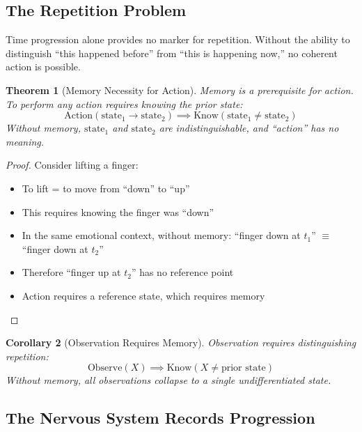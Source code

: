 \documentclass[aps,prd,twocolumn,superscriptaddress,floatfix,nofootinbib]{revtex4-2}
\newtheorem{theorem}{Theorem}[section]
\newtheorem{corollary}[theorem]{Corollary}
\theoremstyle{remark}
\begin{document}
\subsection{The Repetition Problem}

Time progression alone provides no marker for repetition. Without the ability to distinguish ``this happened before'' from ``this is happening now,'' no coherent action is possible.

\begin{theorem}[Memory Necessity for Action]
\label{thm:action_prerequisite}
Memory is a prerequisite for action. To perform any action requires knowing the prior state:
\begin{equation}
\text{Action}(\text{state}_1 \to \text{state}_2) \implies \text{Know}(\text{state}_1 \neq \text{state}_2)
\end{equation}
Without memory, $\text{state}_1$ and $\text{state}_2$ are indistinguishable, and ``action'' has no meaning.
\end{theorem}

\begin{proof}
Consider lifting a finger:
\begin{itemize}
\item To lift = to move from ``down'' to ``up''
\item This requires knowing the finger was ``down''
\item In the same emotional context, without memory: ``finger down at $t_1$'' $\equiv$ ``finger down at $t_2$''
\item Therefore ``finger up at $t_2$'' has no reference point
\item Action requires a reference state, which requires memory
\end{itemize}
\end{proof}

\begin{corollary}[Observation Requires Memory]
\label{cor:observation_memory}
Observation requires distinguishing repetition:
\begin{equation}
\text{Observe}(X) \implies \text{Know}(X \neq \text{prior state})
\end{equation}
Without memory, all observations collapse to a single undifferentiated state.
\end{corollary}

\subsection{The Nervous System Records Progression}
\end{document}
